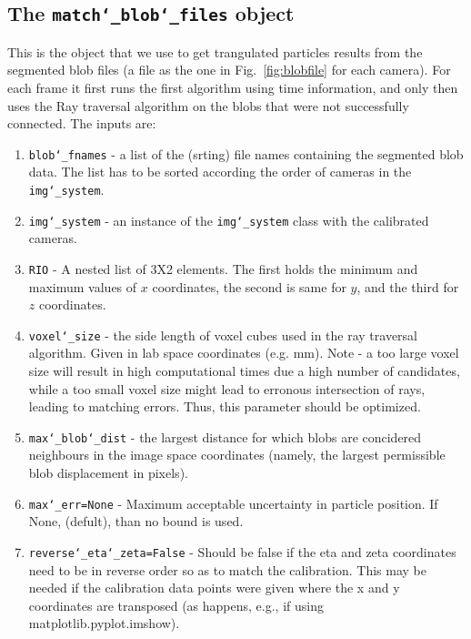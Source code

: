 \documentclass[10pt,a4paper]{article}
\begin{document}
\subsection{The \texttt{match\char`_blob\char`_files} object}


This is the object that we use to get trangulated particles results from the segmented blob files (a file as the one in Fig.~\ref{fig:blobfile} for each camera). For each frame it first runs the first algorithm using time information, and only then uses the Ray traversal algorithm on the blobs that were not successfully connected. The inputs are:
%
\begin{enumerate}
	\item \texttt{blob\char`_fnames} - a list of the (srting) file names containing the segmented blob data. The list has to be sorted according the order of cameras in the \texttt{img\char`_system}.
	
	\item \texttt{img\char`_system} - an instance of the \texttt{img\char`_system} class with the calibrated cameras.
	
	\item \texttt{RIO} - A nested list of 3X2 elements. The first holds the minimum and  maximum values of $x$ coordinates, the second is same for $y$, and  the third for $z$ coordinates. 
	
	\item \texttt{voxel\char`_size} - the side length of voxel cubes used in the ray traversal algorithm. Given in lab space coordinates (e.g. mm). Note - a too large voxel size will result in high computational times due a high number of candidates, while a too small voxel size might lead to erronous intersection of rays, leading to matching errors. Thus, this parameter should be optimized.
	
	\item \texttt{max\char`_blob\char`_dist} - the largest distance for which blobs are concidered neighbours in the image space coordinates (namely, the largest permissible blob displacement in pixels).
	
	\item \texttt{max\char`_err=None} - Maximum acceptable uncertainty in particle position. If None, (defult), than no bound is used.
	
	\item \texttt{reverse\char`_eta\char`_zeta=False} - Should be false if the eta and zeta coordinates need to be in reverse order so as to match the calibration. This may be needed if the calibration data points were given where the x and y coordinates are transposed (as happens, e.g., if using matplotlib.pyplot.imshow).
\end{enumerate}
\end{document}
